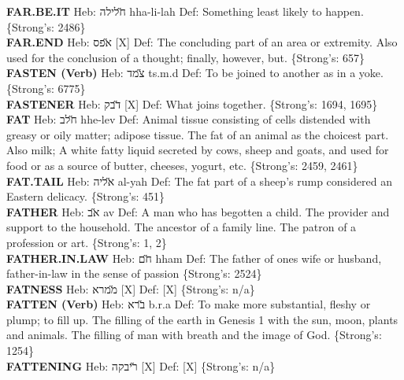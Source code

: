{\textbf{FAR.BE.IT} Heb: {\large\H חלילה} hha-li-lah Def: Something least likely to happen. \{Strong's: 2486\}\hfill{}\\

\textbf{FAR.END} Heb: {\large\H אפס} {[}X{]} Def: The concluding part of an area or extremity. Also used for the conclusion of a thought; finally, however, but. \{Strong's: 657\}\hfill{}\\

\textbf{FASTEN (Verb)} Heb: {\large\H צמד} ts.m.d Def: To be joined to another as in a yoke. \{Strong's: 6775\}\hfill{}\\

\textbf{FASTENER} Heb: {\large\H דבק} {[}X{]} Def: What joins together. \{Strong's: 1694, 1695\}\hfill{}\\

\textbf{FAT} Heb: {\large\H חלב} hhe-lev Def: Animal tissue consisting of cells distended with greasy or oily matter; adipose tissue. The fat of an animal as the choicest part. Also milk; A white fatty liquid secreted by cows, sheep and goats, and used for food or as a source of butter, cheeses, yogurt, etc. \{Strong's: 2459, 2461\}\hfill{}\\

\textbf{FAT.TAIL} Heb: {\large\H אליה} al-yah Def: The fat part of a sheep's rump considered an Eastern delicacy. \{Strong's: 451\}\hfill{}\\

\textbf{FATHER} Heb: {\large\H אב} av Def: A man who has begotten a child. The provider and support to the household. The ancestor of a family line. The patron of a profession or art. \{Strong's: 1, 2\}\hfill{}\\

\textbf{FATHER.IN.LAW} Heb: {\large\H חם} hham Def: The father of ones wife or husband, father-in-law in the sense of passion \{Strong's: 2524\}\hfill{}\\

\textbf{FATNESS} Heb: {\large\H ממרא} {[}X{]} Def: {[}X{]} \{Strong's: n/a\}\hfill{}\\

\textbf{FATTEN (Verb)} Heb: {\large\H ברא} b.r.a Def: To make more substantial, fleshy or plump; to fill up. The filling of the earth in Genesis 1 with the sun, moon, plants and animals. The filling of man with breath and the image of God. \{Strong's: 1254\}\hfill{}\\

\textbf{FATTENING} Heb: {\large\H ריבקה} {[}X{]} Def: {[}X{]} \{Strong's: n/a\}\hfill{}\\

}
